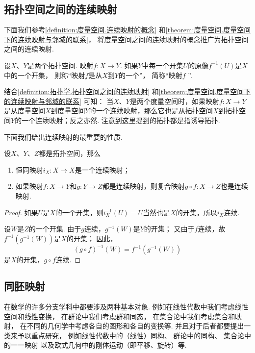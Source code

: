 \subsection{拓扑空间之间的连续映射}
下面我们参考\cref{definition:度量空间.连续映射的概念}
和\cref{theorem:度量空间.度量空间下的连续映射与邻域的联系}，
将度量空间之间的连续映射的概念推广为拓扑空间之间的连续映射.

\begin{definition}\label{definition:拓扑学.拓扑空间之间的连续映射}
设\(X\)、\(Y\)是两个拓扑空间.
映射\(f\colon X \to Y\).
如果\(Y\)中每一个开集\(U\)的原像\(f^{-1}(U)\)是\(X\)中的一个开集，
则称“映射\(f\)是从\(X\)到\(Y\)的一个”，
简称“映射\(f\) ”.
\end{definition}
结合\cref{definition:拓扑学.拓扑空间之间的连续映射} 和\cref{theorem:度量空间.度量空间下的连续映射与邻域的联系} 可知：
当\(X\)、\(Y\)是两个度量空间时，如果映射\(f\colon X \to Y\)是从度量空间\(X\)到度量空间\(Y\)的一个连续映射，那么它也是从拓扑空间\(X\)到拓扑空间\(Y\)的一个连续映射；反之亦然.
注意到这里提到的拓扑都是指诱导拓扑.

下面我们给出连续映射的最重要的性质.

\begin{theorem}\label{theorem:拓扑学.拓扑空间之间的连续映射的性质}
设\(X\)、\(Y\)、\(Z\)都是拓扑空间，那么
\begin{enumerate}
\item 恒同映射\(i_X\colon X \to X\)是一个连续映射；
\item 如果映射\(f\colon X \to Y\)和\(g\colon Y \to Z\)都是连续映射，则复合映射\(g \circ f\colon X \to Z\)也是连续映射.
\end{enumerate}
\begin{proof}
如果\(U\)是\(X\)的一个开集，则\(i_X^{-1}(U) = U\)当然也是\(X\)的开集，所以\(i_X\)连续.

设\(W\)是\(Z\)的一个开集.
由于\(g\)连续，\(g^{-1}(W)\)是\(Y\)的开集；
又由于\(f\)连续，故\(f^{-1}(g^{-1}(W))\)是\(X\)的开集；
因此，\[
(g \circ f)^{-1}(W) = f^{-1}(g^{-1}(W))
\]是\(X\)的开集，\(g \circ f\)连续.
\end{proof}
\end{theorem}

\subsection{同胚映射}
在数学的许多分支学科中都要涉及两种基本对象.
例如在线性代数中我们考虑线性空间和线性变换，%
在群论中我们考虑群和同态，%
在集合论中我们考虑集合和映射，%
在不同的几何学中考虑各自的图形和各自的变换等.
并且对于后者都要提出一类来予以重点研究，%
例如线性代数中的（线性）同构、%
群论中的同构、%
集合论中的一一映射%
以及欧式几何中的刚体运动（即平移、旋转）等.

